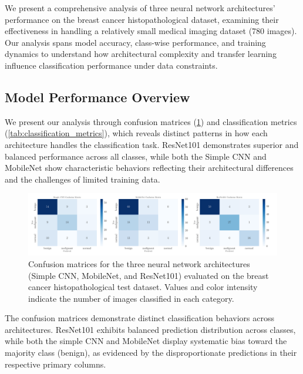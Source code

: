 
We present a comprehensive analysis of three neural network architectures' performance on the breast cancer histopathological dataset, examining their effectiveness in handling a relatively small medical imaging dataset (780 images). Our analysis spans model accuracy, class-wise performance, and training dynamics to understand how architectural complexity and transfer learning influence classification performance under data constraints.

\subsection{Model Performance Overview}

We present our analysis through confusion matrices (\cref{fig:confusion_matrix}) and classification metrics (\cref{tab:classification_metrics}), which reveals distinct patterns in how each architecture handles the classification task. ResNet101 demonstrates superior and balanced performance across all classes, while both the Simple CNN and MobileNet show characteristic behaviors reflecting their architectural differences and the challenges of limited training data.

\onecolumngrid
\begin{figure}[h!]
    \begin{minipage}{.95\textwidth}
        \centering
        \includegraphics[width = .9\textwidth]{../figs/confusion_matrices.pdf}
        \caption{Confusion matrices for the three neural network architectures (Simple CNN, MobileNet, and ResNet101) evaluated on the breast cancer histopathological test dataset. Values and color intensity indicate the number of images classified in each category.}
        \label{fig:confusion_matrix}
    \end{minipage}
\end{figure}
\twocolumngrid

The confusion matrices demonstrate distinct classification behaviors across architectures. ResNet101 exhibits balanced prediction distribution across classes, while both the simple CNN and MobileNet display systematic bias toward the majority class (benign), as evidenced by the disproportionate predictions in their respective primary columns.

